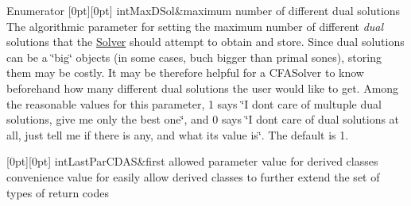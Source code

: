 \begin{DoxyEnumFields}{Enumerator}
[0pt][0pt]{}\mbox{\label{class_s_m_spp__di__unipi__it_1_1_c_d_a_solver_a90159e630999d1355450db84f3aa5fa5a67fa7c1e611dbb82d9b3d283ad42fc8a}} 
int\+Max\+D\+Sol&maximum number of different dual solutions The algorithmic parameter for setting the maximum number of different {\itshape dual} solutions that the \mbox{\hyperlink{class_s_m_spp__di__unipi__it_1_1_solver}{Solver}} should attempt to obtain and store. Since dual solutions can be a \char`\"{}big\char`\"{} objects (in some cases, buch bigger than primal sones), storing them may be costly. It may be therefore helpful for a C\+F\+A\+Solver to know beforehand how many different dual solutions the user would like to get. Among the reasonable values for this parameter, 1 says \char`\"{}\+I don\textquotesingle{}t care
of multuple dual solutions, give me only the best one\char`\"{}, and 0 says \char`\"{}\+I don\textquotesingle{}t care of dual solutions at all, just tell me if there is any, and
what its value is\char`\"{}. The default is 1. \\
\hline

[0pt][0pt]{}\mbox{\label{class_s_m_spp__di__unipi__it_1_1_c_d_a_solver_a90159e630999d1355450db84f3aa5fa5a766cfdd25e01890462e8d496b2126fbe}} 
int\+Last\+Par\+C\+D\+AS&first allowed parameter value for derived classes convenience value for easily allow derived classes to further extend the set of types of return codes \\
\hline

\end{DoxyEnumFields}


